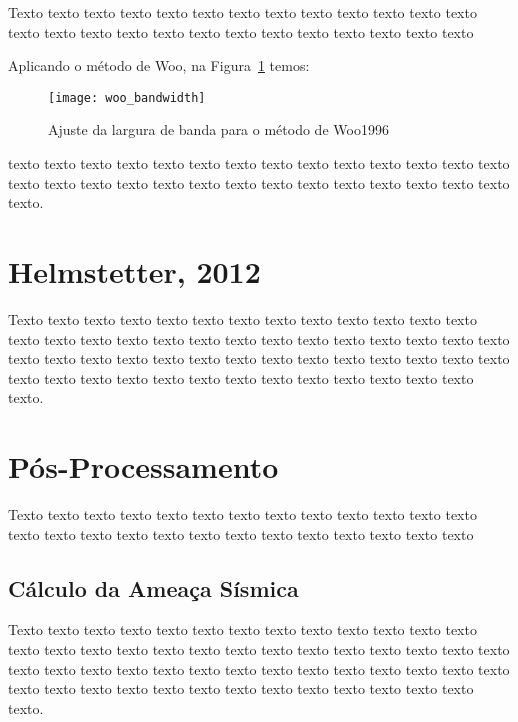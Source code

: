 Texto texto texto texto texto texto texto texto texto texto texto texto texto
texto texto texto texto texto texto texto texto texto texto texto texto texto

Aplicando o método de Woo, na Figura~\ref{fig:woo_b} temos:

\begin{figure}[!h]
  \centering
  \texttt{[image: woo\_bandwidth]} 
  \caption{Ajuste da largura de banda para o método de Woo1996}
  \label{fig:woo_b} 
\end{figure}

texto texto texto texto texto texto texto texto texto texto texto texto texto
texto texto texto texto texto texto texto texto texto texto texto texto texto
texto texto texto.





\section{Helmstetter, 2012}
\label{sec:fundamentos}

Texto texto texto texto texto texto texto texto texto texto texto texto texto
texto texto texto texto texto texto texto texto texto texto texto texto texto
texto texto texto texto texto texto texto texto texto texto texto texto texto
texto texto texto texto texto texto texto texto texto texto texto texto texto
texto texto texto.


\section{Pós-Processamento}
\label{sec:fundamentos}

Texto texto texto texto texto texto texto texto texto texto texto texto texto
texto texto texto texto texto texto texto texto texto texto texto texto texto


\subsection{Cálculo da Ameaça Sísmica}
\label{sec:fundamentos}

Texto texto texto texto texto texto texto texto texto texto texto texto texto
texto texto texto texto texto texto texto texto texto texto texto texto texto
texto texto texto texto texto texto texto texto texto texto texto texto texto
texto texto texto texto texto texto texto texto texto texto texto texto texto
texto texto texto.



